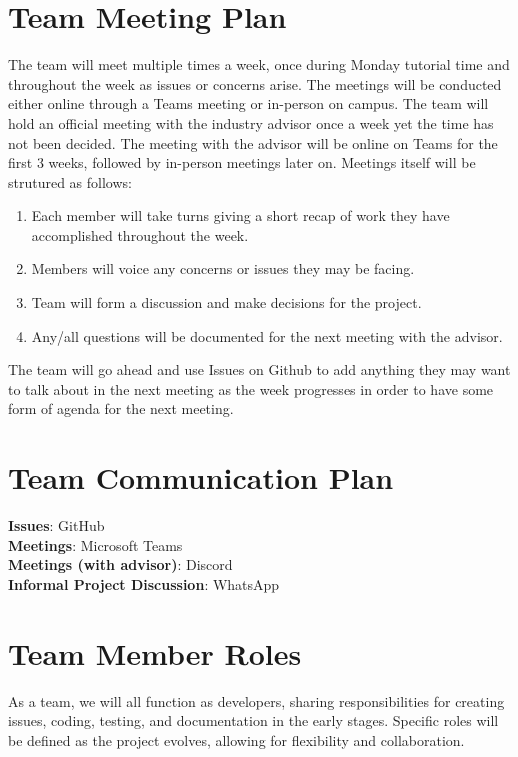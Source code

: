 \documentclass{article}
\begin{document}

\section{Team Meeting Plan}

The team will meet multiple times a week, once during Monday tutorial time and throughout the week as issues or concerns arise. The meetings will be conducted either online through a Teams meeting or in-person on campus. The team
will hold an official meeting with the industry advisor once a week yet the time has not been decided. The meeting with the advisor will be online on Teams for the first 3 weeks, followed by in-person meetings later on. Meetings itself will be strutured as follows:
\begin{enumerate}
  \item Each member will take turns giving a short recap of work they have accomplished throughout the week.
  \item Members will voice any concerns or issues they may be facing.
  \item Team will form a discussion and make decisions for the project.
  \item Any/all questions will be documented for the next meeting with the advisor.
\end{enumerate}
The team will go ahead and use Issues on Github to add anything they may want to talk about in the next meeting as the week progresses in order to have some form of agenda for the next meeting.

\section{Team Communication Plan}

\textbf{Issues}: GitHub \\
\textbf{Meetings}: Microsoft Teams \\
\textbf{Meetings (with advisor)}: Discord \\
\textbf{Informal Project Discussion}: WhatsApp

\section{Team Member Roles}

\hspace{\parindent}As a team, we will all function as developers, sharing responsibilities
for creating issues, coding, testing, and documentation in the early stages. Specific roles
will be defined as the project evolves, allowing for flexibility and collaboration.
\end{document}
